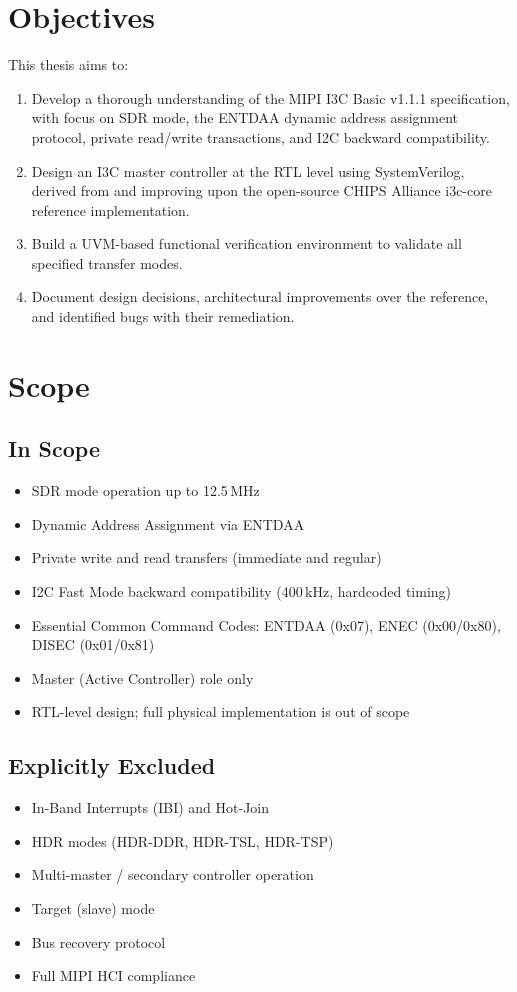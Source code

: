 \documentclass[12pt, a4paper, oneside]{report}
\begin{document}
\section{Objectives}

This thesis aims to:
\begin{enumerate}
  \item Develop a thorough understanding of the MIPI I3C Basic v1.1.1 specification,
        with focus on SDR mode, the ENTDAA dynamic address assignment protocol, private
        read/write transactions, and I2C backward compatibility.
  \item Design an I3C master controller at the RTL level using SystemVerilog, derived
        from and improving upon the open-source CHIPS Alliance i3c-core reference
        implementation.
  \item Build a UVM-based functional verification environment to validate all specified
        transfer modes.
  \item Document design decisions, architectural improvements over the reference, and
        identified bugs with their remediation.
\end{enumerate}

\section{Scope}

\subsection*{In Scope}
\begin{itemize}
  \item SDR mode operation up to 12.5\,MHz
  \item Dynamic Address Assignment via ENTDAA
  \item Private write and read transfers (immediate and regular)
  \item I2C Fast Mode backward compatibility (400\,kHz, hardcoded timing)
  \item Essential Common Command Codes: ENTDAA (0x07), ENEC (0x00/0x80), DISEC (0x01/0x81)
  \item Master (Active Controller) role only
  \item RTL-level design; full physical implementation is out of scope
\end{itemize}

\subsection*{Explicitly Excluded}
\begin{itemize}
  \item In-Band Interrupts (IBI) and Hot-Join
  \item HDR modes (HDR-DDR, HDR-TSL, HDR-TSP)
  \item Multi-master / secondary controller operation
  \item Target (slave) mode
  \item Bus recovery protocol
  \item Full MIPI HCI compliance
\end{itemize}
\end{document}

